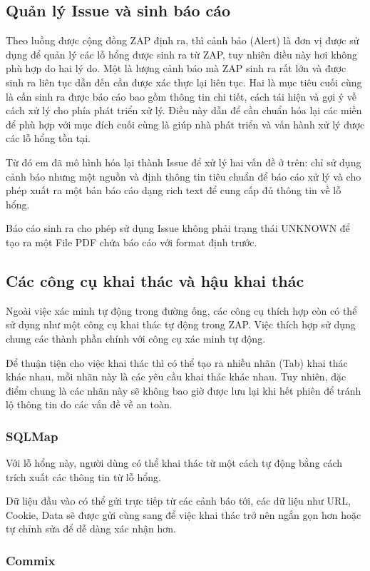 \documentclass[./../main.tex]{subfiles}
\begin{document}
\subsection{Quản lý Issue và sinh báo cáo}
Theo luồng được cộng đồng ZAP định ra, thì cảnh bảo (Alert) là đơn vị được sử dụng để quản lý các lỗ hổng được sinh ra từ ZAP, tuy nhiên điều này hơi không phù hợp do hai lý do. Một là lượng cảnh báo mà ZAP sinh ra rất lớn và được sinh ra liên tục dẫn đến cần được xác thực lại liên tục. Hai là mục tiêu cuối cùng là cần sinh ra được báo cáo bao gồm thông tin chi tiết, cách tái hiện và gợi ý về cách xử lý cho phía phát triển xử lý. Điều này dẫn để cần chuẩn hóa lại các miền để phù hợp với mục đích cuối cùng là giúp nhà phát triển và vấn hành xử lý được các lỗ hổng tồn tại.

Từ đó em đã mô hình hóa lại thành Issue để xử lý hai vấn đề ở trên: chỉ sử dụng cảnh báo nhưng một nguồn và định thông tin tiêu chuẩn để báo cáo xử lý và cho phép xuất ra một bản báo cáo dạng rich text để cung cấp đủ thông tin về lỗ hổng.

Báo cáo sinh ra cho phép sử dụng Issue không phải trạng thái UNKNOWN để tạo ra một File PDF chứa báo cáo với format định trước.
\subsection{Các công cụ khai thác và hậu khai thác}

Ngoài việc xác minh tự động trong đường ống, các công cụ thích hợp còn có thể sử dụng như một công cụ khai thác tự động trong ZAP. Việc thích hợp sử dụng chung các thành phần chính với công cụ xác minh tự động.

Để thuận tiện cho việc khai thác thì có thể tạo ra nhiều nhãn (Tab) khai thác khác nhau, mỗi nhãn này là các yêu cầu khai thác khác nhau. Tuy nhiên, đặc điểm chung là các nhãn này sẽ không bao giờ được lưu lại khi hết phiên để tránh lộ thông tin do các vấn đề về an toàn.
\subsubsection{SQLMap}
Với lỗ hổng này, người dùng có thể khai thác từ một cách tự động bằng cách trích xuất các thông tin từ lỗ hổng.

Dữ liệu đầu vào có thể gửi trực tiếp từ các cảnh báo tới, các dữ liệu như URL, Cookie, Data sẽ được gửi cùng sang để việc khai thác trở nên ngắn gọn hơn hoặc tự chỉnh sửa để dễ dàng xác nhận hơn.
\subsubsection{Commix}
\end{document}
